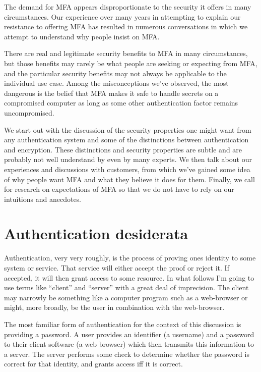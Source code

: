 \documentclass{soups}
\begin{document}
The demand for MFA appears disproportionate to the security it offers in many circumstances. Our experience over many years in attempting to explain our resistance to offering MFA has resulted in numerous conversations in which we attempt to understand why people insist on MFA\@.

There are real and legitimate security benefits to MFA in many circumstances, but those benefits may rarely be what people are seeking or expecting from MFA, and the particular security benefits may not always be applicable to the individual use case.
Among the misconceptions we've observed, the most dangerous is the belief that
MFA makes it safe to handle secrets on a compromised computer as long as some other authentication factor remains uncompromised.

We start out with the discussion of the security properties one might want from any authentication system and some of the distinctions between authentication and encryption.
These distinctions and security properties are subtle and are probably not well understand by even by many experts. 
We then talk about our experiences and discussions with customers, from which we've gained some idea of why people want MFA and what they believe it does for them.
Finally, we call for research on expectations of MFA so that we do not have to rely on our intuitions and anecdotes.

\section{Authentication desiderata}\label{sec:desiderata}

Authentication, very very roughly, is the process of proving ones identity to some system or service.
That service will either accept the proof or reject it.
If accepted, it will then grant access to some resource. In what follows I'm going to use terms like ``client'' and ``server'' with a great deal of imprecision. The client may narrowly be something like a computer program such as a web-browser or might, more broadly, be the user in combination with the web-browser.

The most familiar form of authentication for the context of this discussion is providing a password. A user provides an identifier (a username) and a password to their client software (a web browser) which then transmits this information to a server. The server performs some check to determine whether the password is correct for that identity, and grants access iff it is correct.
\end{document}
